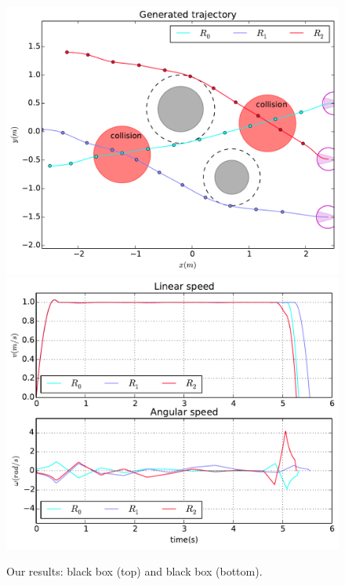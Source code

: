 \documentclass[eprint]{actapoly}
\begin{document}
\begin{figure}[!h]\centering
  \includegraphics[width=\linewidth]{./images/collision/multirobot-path.pdf} %
  \\[1mm]
  \includegraphics[width=\linewidth]{./images/collision/multirobot-vw.pdf} %
  \caption{Our results: black box (top) and black box 
(bottom).\label{fig:collision}}
\label{fig:res}
\end{figure}
\end{document}
